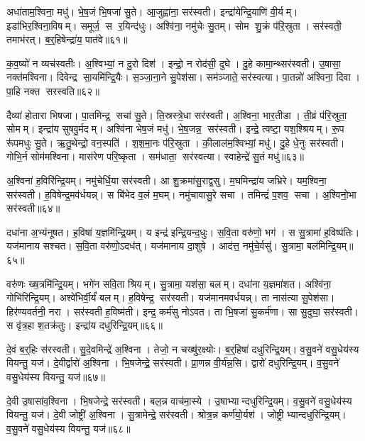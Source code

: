 अधा॑ताम॒श्विना॒ मधु॑। भे॒ष॒जं भि॒षजा॑ सु॒ते। आ॒जुह्वा॑ना॒ सर॑स्वती। इन्द्रा॑येन्द्रि॒याणि॑ वी॒र्यम्। इडा॑भिर॒श्विना॒विषम्। समूर्ज॒ स र॒यिन्द॑धुः। अश्वि॑ना॒ नमु॑चेः सु॒तम्। सोम शु॒क्रं प॑रि॒स्रुता। सर॑स्वती॒ तमाभ॑रत्। ब॒र्॒हिषेन्द्रा॑य॒ पात॑वे॥६१॥

क॒व॒ष्यो॑ न व्यच॑स्वतीः। अ॒श्विभ्यां॒ न दु॒रो दिश॑। इन्द्रो॒ न रोद॑सी॒ दुघे। दु॒हे कामा॒न्थ्सर॑स्वती। उ॒षासा॒ नक्त॑मश्विना। दिवेन्द्र सा॒यमि॑न्द्रि॒यैः। स॒ञ्जा॒ना॒ने सु॒पेश॑सा। सम॑ञ्जाते॒ सर॑स्वत्या। पा॒तन्नो॑ अश्विना॒ दिवा। पा॒हि नक्त सरस्वति॥६२॥

दैव्या॑ होतारा भिषजा। पा॒तमिन्द्र॒ सचा॑ सु॒ते। ति॒स्रस्त्रे॒धा सर॑स्वती। अ॒श्विना॒ भार॒तीडा। ती॒व्रं प॑रि॒स्रुता॒ सोमम्। इन्द्रा॑य सुषवु॒र्मदम्। अश्वि॑ना भेष॒जं मधु॑। भे॒ष॒जन्न॒ सर॑स्वती। इन्द्रे॒ त्वष्टा॒ यश॒श्श्रियम्। रू॒प रू॑पमधुः सु॒ते। ऋ॒तु॒थेन्द्रो॒ वन॒स्पति॑। श॒श॒मा॒नः प॑रि॒स्रुता। की॒लाल॑म॒श्विभ्यां॒ मधु॑। दु॒हे धे॒नुः सर॑स्वती। गोभि॒र्न सोम॑मश्विना। मास॑रेण परि॒ष्कृता। सम॑धाता॒ सर॑स्वत्या। स्वाहेन्द्रे॑ सु॒तं मधु॑॥६३॥\anuvakamend[न॒ग्नहु॒ पात॑वे सरस्वत्यधुः सु॒तेऽष्टौ च॑]

अ॒श्विना॑ ह॒विरि॑न्द्रि॒यम्। नमु॑चेर्धि॒या सर॑स्वती। आ शु॒क्रमा॑सु॒राद्व॒सु। म॒घमिन्द्रा॑य जभ्रिरे। यम॒श्विना॒ सर॑स्वती। ह॒विषेन्द्र॒मव॑र्धयन्न्। स बि॑भेद व॒लं म॒घम्। नमु॑चावासु॒रे सचा। तमिन्द्रं॑ प॒शव॒ सचा। अ॒श्विनो॒भा सर॑स्वती॥६४॥

दधा॑ना अ॒भ्य॑नूषत। ह॒विषा॑ य॒ज्ञमि॑न्द्रि॒यम्। य इन्द्र॑ इन्द्रि॒यन्द॒धुः। स॒वि॒ता वरु॑णो॒ भग॑। स सु॒त्रामा॑ ह॒विष्प॑तिः। यज॑मानाय सश्चत। स॒वि॒ता वरु॑णो॒ऽदध॑त्। यज॑मानाय दा॒शुषे। आद॑त्त॒ नमु॑चे॒र्वसु॑। सु॒त्रामा॒ बल॑मिन्द्रि॒यम्॥६५॥

वरु॑णः ख्ष॒त्रमि॑न्द्रि॒यम्। भगे॑न सवि॒ता श्रियम्। सु॒त्रामा॒ यश॑सा॒ बलम्। दधा॑ना य॒ज्ञमा॑शत। अश्वि॑ना॒ गोभि॑रिन्द्रि॒यम्। अश्वे॑भिर्वी॒र्यं॑ बलम्। ह॒विषेन्द्र॒ सर॑स्वती। यज॑मानमवर्धयन्न्। ता नास॑त्या सु॒पेश॑सा। हिर॑ण्यवर्तनी॒ नरा। सर॑स्वती ह॒विष्म॑ती। इन्द्र॒ कर्म॑सु नोऽवत। ता भि॒षजा॑ सु॒कर्म॑णा। सा सु॒दुघा॒ सर॑स्वती। स वृ॑त्र॒हा श॒तक्र॑तुः। इन्द्रा॑य दधुरिन्द्रि॒यम्॥६६॥\anuvakamend[उ॒भा सर॑स्वती॒ बल॑मिन्द्रि॒यन्नरा॒ षट्च॑]

दे॒वं ब॒र्॒हिः स॑रस्वती। सु॒दे॒वमिन्द्रे॑ अ॒श्विना। तेजो॒ न चख्षु॑र॒क्ष्योः। ब॒र्॒हिषा॑ दधुरिन्द्रि॒यम्। व॒सु॒वने॑ वसु॒धेय॑स्य वियन्तु॒ यज॑। दे॒वीर्द्वारो॑ अ॒श्विना। भि॒षजेन्द्रे॒ सर॑स्वती। प्रा॒णन्न वी॒र्य॑न्न॒सि। द्वारो॑ दधुरिन्द्रि॒यम्। व॒सु॒वने॑ वसु॒धेय॑स्य वियन्तु॒ यज॑॥६७॥

दे॒वी उ॒षासा॑व॒श्विना। भि॒षजेन्द्रे॒ सर॑स्वती। बल॒न्न वाच॑मा॒स्ये। उ॒षाभ्यान्दधुरिन्द्रि॒यम्। व॒सु॒वने॑ वसु॒धेय॑स्य वियन्तु॒ यज॑। दे॒वी जोष्ट्री॑ अ॒श्विना। सु॒त्रामेन्द्रे॒ सर॑स्वती। श्रोत्र॒न्न कर्ण॑यो॒र्यश॑। जोष्ट्रीभ्यान्दधुरिन्द्रि॒यम्। व॒सु॒वने॑ वसु॒धेय॑स्य वियन्तु॒ यज॑॥६८॥

